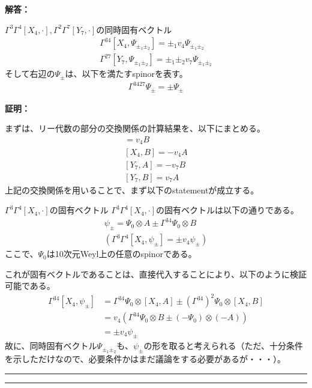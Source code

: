 \documentclass[dvipdfmx,a4paper,10.5pt]{article}
\numberwithin{equation}{section}
\newenvironment{proofbox}
{\begin{prooflabel}\textbf{証明：}\end{prooflabel}\vspace{0.8em}}
{\par\vspace{1em}\hrule\vspace{1em}}
\newenvironment{answerbox}
{\begin{prooflabel}\textbf{解答：}\end{prooflabel}\vspace{0.8em}}
{\par\vspace{1em}\hrule\vspace{1em}}
\begin{document}
\begin{answerbox}
\begin{resultbox}{$\Gamma^{3}\Gamma^{4}[X_{4},\cdot],\Gamma^{2}\Gamma^{7}[Y_{7},\cdot]$の同時固有ベクトル}
        \begin{align*}
            \Gamma^{34}[X_{4},\Psi_{\pm_{1}\pm_{2}}]=\pm_{1} v_{4}\Psi_{\pm_{1}\pm_{2}}\\
            \Gamma^{27}[Y_{7},\Psi_{\pm_{1}\pm_{2}}]=\pm_{1}\pm_{2} v_{7}\Psi_{\pm_{1}\pm_{2}}
        \end{align*}
        そして右辺の$\Psi_{\pm}$は、以下を満たすspinorを表す。
        \begin{align*}
            \Gamma^{3427}\Psi_{\pm}=\pm \Psi_{\pm}
        \end{align*}
    \end{resultbox}
    \begin{proofbox}
        まずは、リー代数の部分の交換関係の計算結果を、以下にまとめる。
        \begin{align*}
            [X_{4},A]=v_{4}B\\
            [X_{4},B]=-v_{4}A\\
            [Y_{7},A]=-v_{7}B\\
            [Y_{7},B]=v_{7}A
        \end{align*}
        上記の交換関係を用いることで、まず以下のstatementが成立する。
        \begin{resultbox}{$\Gamma^{3}\Gamma^{4}[X_{4},\cdot]$の固有ベクトル}
            $\Gamma^{3}\Gamma^{4}[X_{4},\cdot]$の固有ベクトルは以下の通りである。
            \begin{gather*}
                \psi_{\pm} = \Psi_{0}\otimes A \pm \Gamma^{34}\Psi_{0} \otimes B \\
                (\Gamma^{3}\Gamma^{4}[X_{4},\psi_{\pm}]=\pm v_{4}\psi_{\pm})
            \end{gather*}
            ここで、$\Psi_{0}$は10次元Weyl上の任意のspinorである。
        \end{resultbox}
        これが固有ベクトルであることは、直接代入することにより、以下のように検証可能である。
        \begin{align*}
            \Gamma^{34}[X_{4},\psi_{\pm}] 
            &=\Gamma^{34}\Psi_{0} \otimes [X_{4},A] \pm (\Gamma^{34})^{2}\Psi_{0} \otimes [X_{4},B]\\
            &=v_{4}(\Gamma^{34}\Psi_{0} \otimes B \pm (-\Psi_{0})\otimes (-A))\\
            &=\pm v_{4} \psi_{\pm}
        \end{align*}
        故に、同時固有ベクトル$\Psi_{\pm_{1}\pm_{2}}$も、$\psi_{\pm}$の形を取ると考えられる（ただ、十分条件を示しただけなので、必要条件かはまだ議論をする必要があるが・・・）。\\

\end{proofbox}
\end{answerbox}
\end{document}
